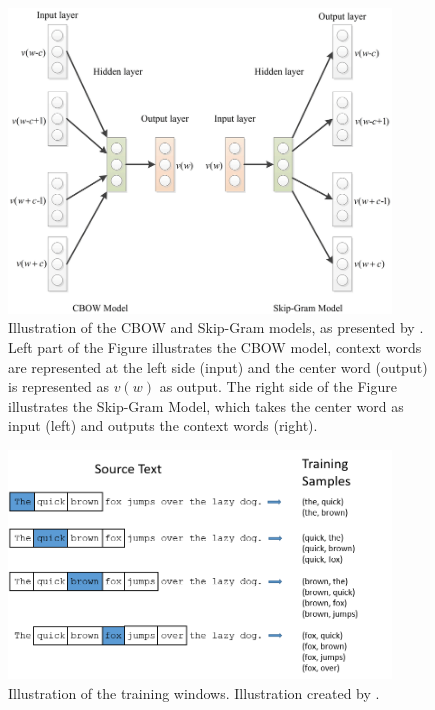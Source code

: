 \documentclass[../../Thesis.tex]{subfiles}
\begin{document}
\begin{jumpin}
\begin{figure}[hbt]
\begin{center}
\includegraphics[width=4in]{Plots/Model-Architecture-of-CBOW-and-Skip-Gram.png}
\caption{Illustration of the CBOW and Skip-Gram models, as presented by \citet{chen2017convolutional}. Left part of the Figure illustrates the CBOW model, context words are represented at the left side (input) and the center word (output) is represented as $v(w)$ as output. The right side of the Figure illustrates the Skip-Gram Model, which takes the center word as input (left) and outputs the context words (right).}\label{figure:word2vecModels}
\end{center}
\end{figure}
\begin{figure}[hbt]
\begin{center}
\includegraphics[width=4in]{Plots/training_window.png}
\caption{Illustration of the training windows. Illustration created by \citet{trainingWindow}.}
\end{center}
\end{figure}
\FloatBarrier
{}

\end{jumpin}
\end{document}
